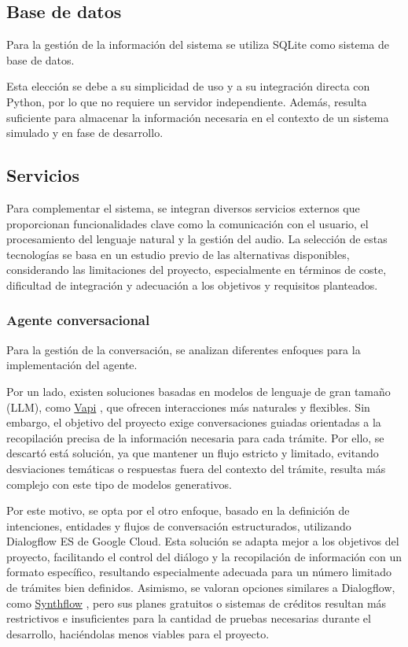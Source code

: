     \subsection{Base de datos}
        Para la gestión de la información del sistema se utiliza SQLite como sistema de base de datos. 

        Esta elección se debe a su simplicidad de uso y a su integración directa con Python, por lo que no requiere un servidor independiente. 
        Además, resulta suficiente para almacenar la información necesaria en el contexto de un sistema simulado y en fase de desarrollo. 

    \subsection{Servicios}
        Para complementar el sistema, se integran diversos servicios externos que proporcionan funcionalidades clave como la comunicación con el usuario, el procesamiento del lenguaje natural y la gestión del audio. 
        La selección de estas tecnologías se basa en un estudio previo de las alternativas disponibles, considerando las limitaciones del proyecto, especialmente en términos de coste, dificultad de integración y adecuación a los objetivos y requisitos planteados. 

        \subsubsection{Agente conversacional}
            Para la gestión de la conversación, se analizan diferentes enfoques para la implementación del agente. 

            Por un lado, existen soluciones basadas en modelos de lenguaje de gran tamaño (LLM), como \href{https://dashboard.vapi.ai/}{Vapi} \cite{ref14}, que ofrecen interacciones más naturales y flexibles. 
            Sin embargo, el objetivo del proyecto exige conversaciones guiadas orientadas a la recopilación precisa de la información necesaria para cada trámite. 
            Por ello, se descartó está solución, ya que mantener un flujo estricto y limitado, evitando desviaciones temáticas o respuestas fuera del contexto del trámite, resulta más complejo con este tipo de modelos generativos. 

            Por este motivo, se opta por el otro enfoque, basado en la definición de intenciones, entidades y flujos de conversación estructurados, utilizando Dialogflow ES \cite{ref10} de Google Cloud. 
            Esta solución se adapta mejor a los objetivos del proyecto, facilitando el control del diálogo y la recopilación de información con un formato específico, resultando especialmente adecuada para un número limitado de trámites bien definidos. 
            Asimismo, se valoran opciones similares a Dialogflow, como \href{https://synthflow.ai/}{Synthflow} \cite{ref13}, pero sus planes gratuitos o sistemas de créditos resultan más restrictivos e insuficientes para la cantidad de pruebas necesarias durante el desarrollo, haciéndolas menos viables para el proyecto. 

